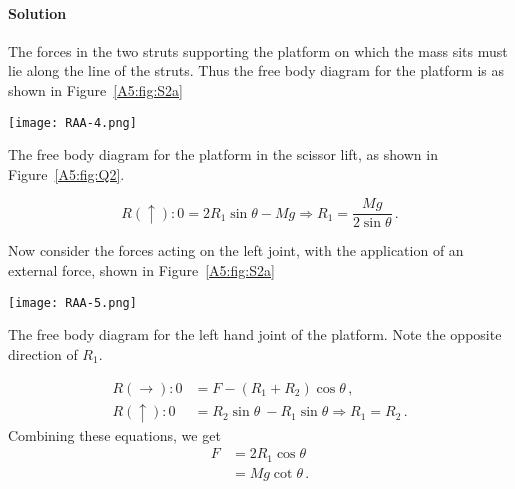 \documentclass[a4paper,justified,oneside]{tufte-handout}
\numberwithin{equation}{subsection}
\begin{document}
\begin{solution}
\paragraph{Solution}
The forces in the two struts supporting the platform on which the mass sits must lie along the line of the struts. Thus the free body diagram for the platform is as shown in Figure~\ref{A5:fig:S2a}
\begin{marginfigure}[0mm]
	\centering
	\texttt{[image: RAA-4.png]}
	\caption{The free body diagram for the platform in the scissor lift, as shown in Figure~\protect\ref{A5:fig:Q2}.}
	\label{A5:fig:S2a}
\end{marginfigure}
\begin{equation*}
	R\left(\uparrow\right):	0=2R_1 \sin\theta -Mg\Rightarrow R_1=\frac{Mg}{2\sin\theta}\,.
\end{equation*}

Now consider the forces acting on the left joint, with the application of an external force, shown in Figure~\ref{A5:fig:S2a}
\begin{marginfigure}[0mm]
	\centering
	\texttt{[image: RAA-5.png]}
	\caption{The free body diagram for the left hand joint of the platform. Note the opposite direction of $R_1$.}
	\label{A5:fig:S2b}
\end{marginfigure}
\begin{align*}
	R\left(\rightarrow\right):	0&= F- \left(R_1 +R_2 \right) \cos\theta\,,\\
	R\left(\uparrow\right):	0&=R_2 \sin\theta\ - R_1\sin\theta \Rightarrow R_1 = R_2\,.
\end{align*}
Combining these equations, we get
\begin{align*}
	F	&=2R_1\cos\theta\\
	&=Mg \cot\theta\,.
\end{align*}
\clearpage
\end{solution}
\end{document}
